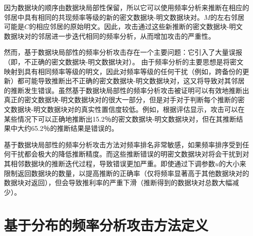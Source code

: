 因为数据块的顺序由数据块局部性保留，所以它可以使用频率分析来推断在相应的邻居中具有相同的共现频率等级的新的密文数据块-明文数据块对。$M$的左右邻居可能是$C$的相应邻居的原始明文。因此，攻击通过这些新推断的密文数据块-明文数据块对的邻居进一步迭代相同的频率分析，从而增加攻击的严重性。


% 	
%
% 	  
%
%

然而，基于数据块局部性的频率分析攻击存在一个主要问题：它引入了大量误报（即，不正确的密文数据块-明文数据块对）。 由于频率分析的主要思想是将密文映射到具有相同频率等级的明文，因此对频率等级的任何干扰（例如，跨备份的更新）都可能导致推断出不正确的密文数据块-明文数据块对，这又将导致对其邻居的推断发生错误。虽然基于数据块局部性的频率分析攻击被证明可以有效地推断出真正的密文数据块-明文数据块对的很大一部分，但是对手对于判断每个推断的密文数据块-明文数据块对的真实性置信度较低。例如，根据评估显示，攻击可以在某些情况下可以正确地推断出15.2％的密文数据块-明文数据块对，但在其推断结果中大约65.2％的推断结果是错误的。 


基于数据块局部性的频率分析攻击方法对频率排名非常敏感，如果频率排序受到任何干扰都会极大的降低推断精度。而这些推断错误的明密文数据块对将会干扰到对其相邻数据块的推断迭代过程，导致错误更加严重。即使通过下调参数$u$的大小来限制返回数据块的数量，以提高推断的正确率（仅将频率显著高于其他数据块对的数据块对返回），但会导致推利率的严重下滑（推断得到的数据块对总数大幅减少）。

\section{基于分布的频率分析攻击方法定义}
\label{sec:distribution-attack-description}

